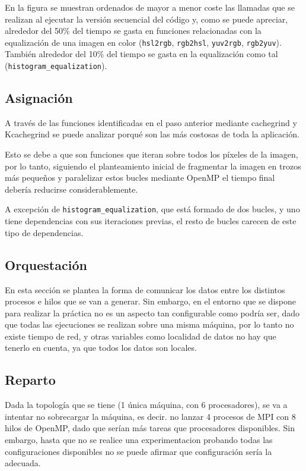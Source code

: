 \documentclass[12pt]{report} %
\begin{document}
En la figura  se muestran ordenados de mayor a menor coste las llamadas que se
realizan al ejecutar la versión secuencial del código y, como se puede apreciar, alrededor del 50\% del tiempo
se gasta en funciones relacionadas con la equalización de una imagen en color (\texttt{hsl2rgb}, \texttt{rgb2hsl},
\texttt{yuv2rgb}, \texttt{rgb2yuv}). También alrededor del 10\% del tiempo se gasta en la equalización como tal
(\texttt{histogram\_equalization}).


\subsection{Asignación}

A través de las funciones identificadas en el paso anterior mediante cachegrind y Kcachegrind se puede analizar porqué son las más costosas de toda la aplicación.

Esto se debe a que son funciones que iteran sobre todos los píxeles de la imagen, por lo tanto, siguiendo el
planteamiento inicial de fragmentar la imagen en trozos más pequeños y paralelizar estos bucles mediante
OpenMP el tiempo final debería reducirse considerablemente.

A excepción de \texttt{histogram\_equalization}, que está formado de dos bucles, y uno tiene dependencias
con sus iteraciones previas, el resto de bucles carecen de este tipo de dependencias.


\subsection{Orquestación}

En esta sección se plantea la forma de comunicar los datos entre los distintos procesos e hilos que se van a generar.
Sin embargo, en el entorno que se dispone para realizar la práctica no es un aspecto tan configurable como podría ser,
dado que todas las ejecuciones se realizan sobre una misma máquina, por lo tanto no existe tiempo de red, y otras
variables como localidad de datos no hay que tenerlo en cuenta, ya que todos los datos son locales.



\subsection{Reparto}

Dada la topología que se tiene (1 única máquina, con 6 procesadores), se va a intentar no sobrecargar la máquina,
es decir. no lanzar 4 procesos de MPI con 8 hilos de OpenMP, dado que serían más tareas que procesadores
disponibles. Sin embargo, hasta que no se realice una experimentacion probando todas las configuraciones
disponibles no se puede afirmar que configuración sería la adecuada.
\end{document}

